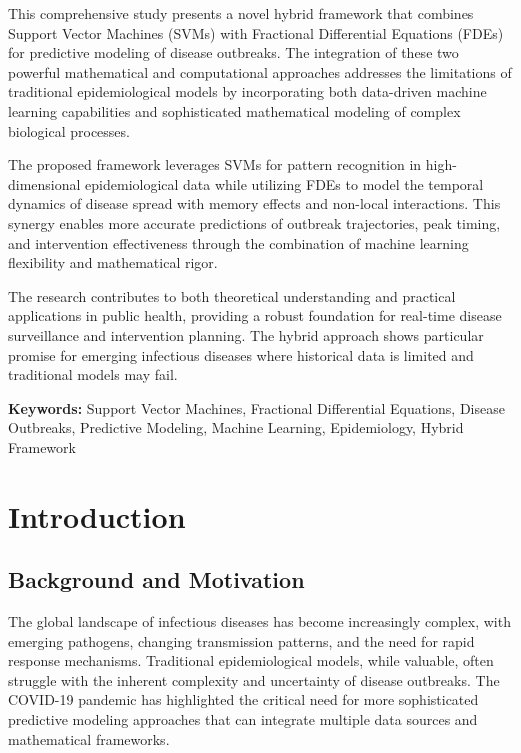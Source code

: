 \documentclass[12pt,a4paper]{report}
\begin{document}
This comprehensive study presents a novel hybrid framework that combines Support Vector Machines (SVMs) with Fractional Differential Equations (FDEs) for predictive modeling of disease outbreaks. The integration of these two powerful mathematical and computational approaches addresses the limitations of traditional epidemiological models by incorporating both data-driven machine learning capabilities and sophisticated mathematical modeling of complex biological processes.

The proposed framework leverages SVMs for pattern recognition in high-dimensional epidemiological data while utilizing FDEs to model the temporal dynamics of disease spread with memory effects and non-local interactions. This synergy enables more accurate predictions of outbreak trajectories, peak timing, and intervention effectiveness through the combination of machine learning flexibility and mathematical rigor.

The research contributes to both theoretical understanding and practical applications in public health, providing a robust foundation for real-time disease surveillance and intervention planning. The hybrid approach shows particular promise for emerging infectious diseases where historical data is limited and traditional models may fail.

\textbf{Keywords:} Support Vector Machines, Fractional Differential Equations, Disease Outbreaks, Predictive Modeling, Machine Learning, Epidemiology, Hybrid Framework

\newpage

\tableofcontents
\newpage
\listoffigures
\newpage
\listoftables
\newpage

\chapter{Introduction}

\section{Background and Motivation}

The global landscape of infectious diseases has become increasingly complex, with emerging pathogens, changing transmission patterns, and the need for rapid response mechanisms. Traditional epidemiological models, while valuable, often struggle with the inherent complexity and uncertainty of disease outbreaks. The COVID-19 pandemic has highlighted the critical need for more sophisticated predictive modeling approaches that can integrate multiple data sources and mathematical frameworks.
\end{document}
